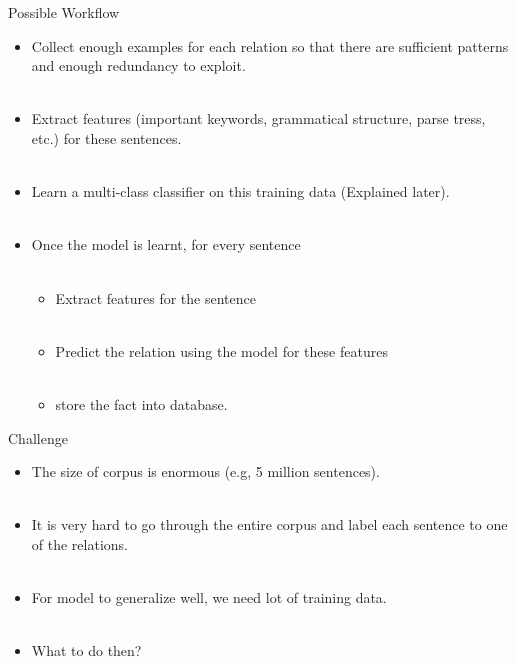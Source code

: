 \documentclass{beamer}
\begin{document}
\begin{frame}{Possible Workflow} \pause
  \begin{itemize}
   \item Collect enough examples for each relation so that there are sufficient patterns and enough redundancy to exploit.\pause  \\~\\
   \item Extract features (important keywords, grammatical structure, parse tress, etc.) for these sentences. \pause \\~\\
   \item Learn a multi-class classifier on this training data (Explained later). \pause \\~\\
   \item Once the model is learnt, for every sentence \pause \\~\\
    \begin{itemize}
	\item Extract features for the sentence \pause \\~\\
	\item Predict the relation using the model for these features \pause \\~\\
	\item store the fact into database. 
     \end{itemize}
  \end{itemize}
\end{frame}

\begin{frame}{Challenge}
 \begin{itemize}
  \item The size of corpus is enormous (e.g, 5 million sentences).  \pause \\~\\
  \item It is very hard to go through the entire corpus and label each sentence to one of the relations. \pause \\~\\
  \item For model to generalize well, we need lot of training data. \pause \\~\\
  \item What to do then?
 \end{itemize}
\end{frame}
\end{document}
